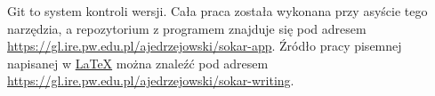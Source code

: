 \par
Git to system kontroli wersji.
Cała praca została wykonana przy asyście tego narzędzia, a repozytorium z programem znajduje się pod adresem \url{https://gl.ire.pw.edu.pl/ajedrzejowski/sokar-app}.
Źródło pracy pisemnej napisanej w \href{https://www.latex-project.org/}{LaTeX} można znaleźć pod adresem \url{https://gl.ire.pw.edu.pl/ajedrzejowski/sokar-writing}.